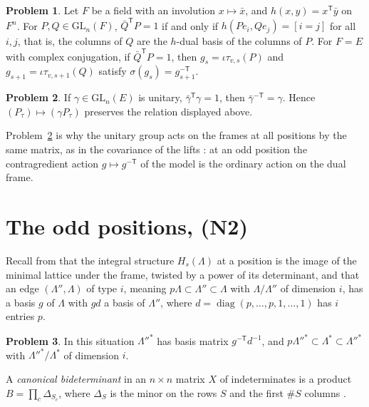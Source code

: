 \documentclass[reqno]{amsart}
\theoremstyle{definition}
\newtheorem{problem}{Problem}[section]
\theoremstyle{plain}
\theoremstyle{remark}
\begin{document}
\begin{problem}\label{pr:dual-basis}
Let \(F\) be a field with an involution \(x\mapsto\bar x\), and \(h(x,y)=x^{\mathsf T}\bar y\) on \(F^n\).  For \(P,Q\in\mathrm{GL}_n(F)\), \(\bar Q^{\mathsf T}P=1\) if and only if \(h(Pe_i,Qe_j)=[i=j]\) for all \(i,j\), that is, the columns of \(Q\) are the \(h\)-dual basis of the columns of \(P\).  For \(F=E\) with complex conjugation, if \(\bar Q^{\mathsf T}P=1\), then \(g_s=\iota\tau_{v,s}(P)\) and \(g_{s+1}=\iota\tau_{v,s+1}(Q)\) satisfy \(\sigma(g_s)=g_{s+1}^{-\mathsf T}\).
\end{problem}

\begin{problem}\label{pr:unitary-dual}
If \(\gamma\in\mathrm{GL}_n(E)\) is unitary, \(\bar\gamma^{\mathsf T}\gamma=1\), then \(\bar\gamma^{-\mathsf T}=\gamma\).  Hence \((P_\tau)\mapsto(\gamma P_\tau)\) preserves the relation displayed above.
\end{problem}

Problem~\ref{pr:unitary-dual} is why the unitary group acts on the frames at all positions by the same matrix, as in the covariance of the lifts \cite[Lemma~11.11]{Adr}: at an odd position the contragredient action \(g\mapsto g^{-\mathsf T}\) of the model is the ordinary action on the dual frame.

\section{The odd positions, (N2)}\label{sec:N2}
Recall from \cite[Def.~11.3, Lemma~11.4]{Adr} that the integral structure \(H_s(\Lambda)\) at a position is the image of the minimal lattice under the frame, twisted by a power of its determinant, and that an edge \((\Lambda'',\Lambda)\) of type \(i\), meaning \(p\Lambda\subset\Lambda''\subset\Lambda\) with \(\Lambda/\Lambda''\) of dimension \(i\), has a basis \(g\) of \(\Lambda\) with \(gd\) a basis of \(\Lambda''\), where \(d=\operatorname{diag}(p,\dots,p,1,\dots,1)\) has \(i\) entries \(p\).

\begin{problem}\label{pr:edge-dual}
In this situation \(\Lambda''^*\) has basis matrix \(g^{-\mathsf T}d^{-1}\), and \(p\Lambda''^*\subset\Lambda^*\subset\Lambda''^*\) with \(\Lambda''^*/\Lambda^*\) of dimension \(i\).
\end{problem}

A \emph{canonical bideterminant} in an \(n\times n\) matrix \(X\) of indeterminates is a product \(B=\prod_c\Delta_{S_c}\), where \(\Delta_S\) is the minor on the rows \(S\) and the first \(\#S\) columns \cite[Def.~11.1]{Adr}.
\end{document}
